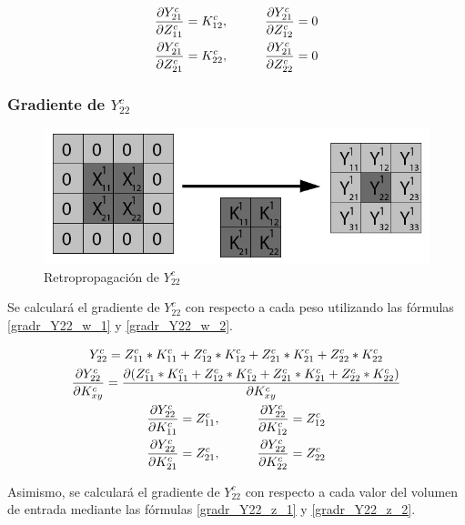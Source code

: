\begin{gather}
	\frac{\partial Y^c_{21}}{\partial Z^c_{11}} = K^c_{12}, \hspace{10mm} \frac{\partial Y^c_{21}}{\partial Z^c_{12}} = 0 \label{gradr_Y21_z_1} \\
	\frac{\partial Y^c_{21}}{\partial Z^c_{21}} = K^c_{22}, \hspace{10mm} \frac{\partial Y^c_{21}}{\partial Z^c_{22}} = 0
\end{gather} \label{gradr_Y21_z_2}

\subsubsection{Gradiente de $Y^c_{22}$}

\begin{figure}[H]
	\centering
	\includegraphics[width=0.8\linewidth]{imagenes/conv_back_padding_5.jpg} 
	\caption{Retropropagación de $Y^c_{22}$}
\end{figure}

Se calculará el gradiente de $Y^c_{22}$ con respecto a cada peso utilizando las fórmulas \ref{gradr_Y22_w_1} y \ref{gradr_Y22_w_2}.


\begin{gather}
	Y^c_{22} = Z^c_{11} * K^c_{11} + Z^c_{12} * K^c_{12} + Z^c_{21} * K^c_{21} + Z^c_{22} * K^c_{22} \\
	\frac{\partial Y^c_{22}}{\partial K^c_{xy}} = \frac{\partial (Z^c_{11} * K^c_{11} + Z^c_{12} * K^c_{12} + Z^c_{21} * K^c_{21} + Z^c_{22} * K^c_{22})}{\partial K^c_{xy}} \\
	\frac{\partial Y^c_{22}}{\partial K^c_{11}} = Z^c_{11}, \hspace{10mm} \frac{\partial Y^c_{22}}{\partial K^c_{12}} = Z^c_{12} \label{gradr_Y22_w_1} \\
	\frac{\partial Y^c_{22}}{\partial K^c_{21}} = Z^c_{21}, \hspace{10mm} \frac{\partial Y^c_{22}}{\partial K^c_{22}} = Z^c_{22} \label{gradr_Y22_w_2}
\end{gather}

Asimismo, se calculará el gradiente de $Y^c_{22}$ con respecto a cada valor del volumen de entrada mediante las fórmulas \ref{gradr_Y22_z_1} y \ref{gradr_Y22_z_2}.

